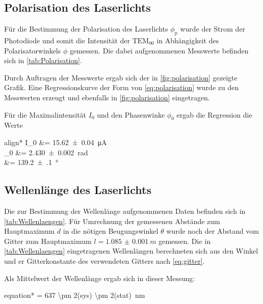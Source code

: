 \subsection{Polarisation des Laserlichts}\label{sec:Polarisation}
	Für die Bestimmung der Polarisation des Laserlichts $\phi_{\mathrm{p}}$ wurde der Strom der Photodiode und somit
	die Intensität der $\mathrm{TEM}_{00}$ in Abhängigkeit des Polarisatorwinkels $\phi$ gemessen. Die dabei aufgenommenen
	Messwerte befinden sich in \cref{tab:Polarisation}. 
	
	\FloatBarrier
	Durch Auftragen der Messwerte ergab sich der in \cref{fig:polarisation} gezeigte Grafik.
	Eine Regressionskurve der Form von \eqref{eq:polarisation} wurde zu den Messwerten erzeugt und
	ebenfalls in \cref{fig:polarisation} eingetragen.
	
	\FloatBarrier
	Für die Maximalintensität $I_0$ und den Phasenwinke $\phi_0$ ergab die Regression die Werte
	
	
	\begin{empheq}{align*}
		I_0 &= \SI{15.62(4)}{\micro\ampere}\\
		\phi_0 &= \SI{2.430(2)}{rad}\\
			   &= \SI{139.2(1)}{\degree}
	\end{empheq}
	

\subsection{Wellenlänge des Laserlichts}\label{sec:Wellenlaenge}
	Die zur Bestimmung der Wellenlänge aufgenommenen Daten befinden sich in \cref{tab:Wellenlaengen}. Für Umrechnung
	der gemessenen Abstände zum Hauptmaximum $d$ in die nötigen Beugungswinkel $\theta$ wurde noch der Abstand vom 
	Gitter zum Hauptmaximum $l = \SI{1.085(1)}{m}$ gemessen. Die in \cref{tab:Wellenlaengen}  eingetragenen Wellenlängen 
	berechneten sich aus den Winkel und er Gitterkonstante des verwendeten Gitters nach \eqref{eq:gitter}.
	
	\FloatBarrier
	Als Mittelwert der Wellenlänge ergab sich in dieser Messung:
	\begin{empheq}{equation*}
		\mean{\lambda} = \SI[parse-numbers=false]{637 \pm 2(sys) \pm 2(stat)}{nm}
	\end{empheq} 
	
